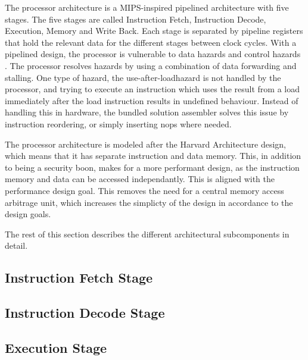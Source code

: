 
The processor architecture is a MIPS-inspired pipelined architecture with five stages.
The five stages are called Instruction Fetch, Instruction Decode, Execution, Memory and Write Back.
Each stage is separated by pipeline registers that hold the relevant data for the different stages between clock cycles.
With a pipelined design, the processor is vulnerable to data hazards and control hazards .
The processor resolves hazards by using a combination of data forwarding and stalling.
One type of hazard, the use-after-load\cn hazard is not handled by the processor, and trying to execute an instruction which uses the result from a load immediately after the load instruction results in undefined behaviour.
Instead of handling this in hardware, the bundled solution assembler solves this issue by instruction reordering, or simply inserting nops where needed.

The processor architecture is modeled after the Harvard Architecture design, which means that it has separate instruction and data memory.
This, in addition to being a security boon, makes for a more performant design, as the instruction memory and data can be accessed independantly.
This is aligned with the performance design goal.
This removes the need for a central memory access arbitrage unit, which increases the simplicty of the design in accordance to the design goals\cn.


The rest of this section describes the different architectural subcomponents in detail.

\newpage
\subsection{Instruction Fetch Stage}
    

\newpage
\subsection{Instruction Decode Stage}
    

\newpage
\subsection{Execution Stage}
    

